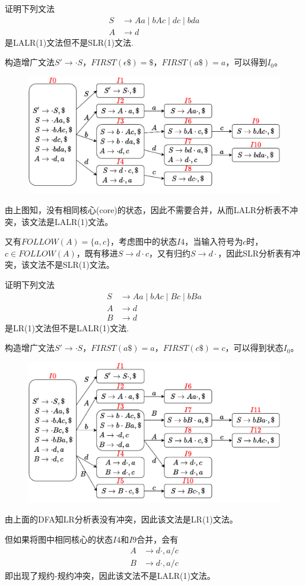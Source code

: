 \begin{example}
证明下列文法
\[\begin{aligned}
S &\to Aa \mid bAc \mid dc \mid bda\\
A &\to d
\end{aligned}\]
是LALR(1)文法但不是SLR(1)文法.
\end{example}
\begin{analysis}
构造增广文法$S'\to\cdot S$，$FIRST(\epsilon\$)=\$$，$FIRST(a\$)=a$，可以得到$I_0$。
\begin{figure}[H]
\centering
\includegraphics[width=0.8\linewidth]{fig/T07-1.pdf}
\end{figure}
由上图知，没有相同核心(core)的状态，因此不需要合并，从而LALR分析表不冲突，该文法是LALR(1)文法。

又有$FOLLOW(A)=\{a,c\}$，考虑图中的状态$I4$，当输入符号为$c$时，$c\in FOLLOW(A)$，既有移进$S\to d\cdot c$，又有归约$S\to d\cdot$，因此SLR分析表有冲突，该文法不是SLR(1)文法。
\end{analysis}
\begin{example}
证明下列文法
\[\begin{aligned}
S &\to Aa \mid bAc \mid Bc \mid bBa\\
A &\to d\\
B &\to d
\end{aligned}\]
是LR(1)文法但不是LALR(1)文法.
\end{example}
\begin{analysis}
构造增广文法$S'\to\cdot S$，$FIRST(a\$)=a$，$FIRST(c\$)=c$，可以得到状态$I_0$。
\begin{figure}[H]
\centering
\includegraphics[width=0.8\linewidth]{fig/T07-2.pdf}
\end{figure}
由上面的DFA知LR分析表没有冲突，因此该文法是LR(1)文法。

但如果将图中相同核心的状态$I4$和$I9$合并，会有
\[\begin{aligned}
A &\to d\cdot,a/c\\
B &\to d\cdot,a/c
\end{aligned}\]
即出现了规约-规约冲突，因此该文法不是LALR(1)文法。
\end{analysis}

